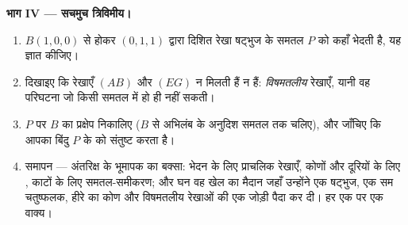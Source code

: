 \begin{problem}
\medskip
\noindent\textbf{भाग IV --- सचमुच त्रिविमीय।}
\begin{enumerate}[resume]
  \item $B(1,0,0)$ से होकर $(0,1,1)$ द्वारा दिशित रेखा षट्भुज के समतल $P$ को कहाँ
        भेदती है, यह ज्ञात कीजिए।
  \item दिखाइए कि रेखाएँ $(AB)$ और $(EG)$ न मिलती हैं न  हैं:
        \emph{विषमतलीय} रेखाएँ, यानी वह परिघटना जो किसी समतल में हो ही नहीं
        सकती।
  \item $P$ पर $B$ का  प्रक्षेप निकालिए ($B$ से अभिलंब के अनुदिश
        समतल तक चलिए), और जाँचिए कि आपका बिंदु $P$ के  को संतुष्ट
        करता है।
  \item समापन --- अंतरिक्ष के भूमापक का बक्सा: भेदन के लिए प्राचलिक रेखाएँ,
        कोणों और दूरियों के लिए , काटों के लिए समतल-समीकरण; और
        घन वह खेल का मैदान जहाँ उन्होंने एक षट्भुज, एक सम चतुष्फलक, हीरे का
        कोण और विषमतलीय रेखाओं की एक जोड़ी पैदा कर दी। हर एक पर एक वाक्य।
\end{enumerate}
\end{problem}
